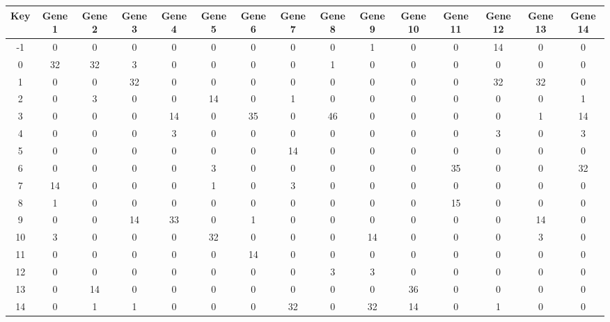 \begin{tabular}{|c|c|c|c|c|c|c|c|c|c|c|c|c|c|c|}
\hline
Key & Gene 1 & Gene 2 & Gene 3 & Gene 4 & Gene 5 & Gene 6 & Gene 7 & Gene 8 & Gene 9 & Gene 10 & Gene 11 & Gene 12 & Gene 13 & Gene 14 \\
\hline
-1 & 0 & 0 & 0 & 0 & 0 & 0 & 0 & 0 & 1 & 0 & 0 & 14 & 0 & 0 \\
0 & 32 & 32 & 3 & 0 & 0 & 0 & 0 & 1 & 0 & 0 & 0 & 0 & 0 & 0 \\
1 & 0 & 0 & 32 & 0 & 0 & 0 & 0 & 0 & 0 & 0 & 0 & 32 & 32 & 0 \\
2 & 0 & 3 & 0 & 0 & 14 & 0 & 1 & 0 & 0 & 0 & 0 & 0 & 0 & 1 \\
3 & 0 & 0 & 0 & 14 & 0 & 35 & 0 & 46 & 0 & 0 & 0 & 0 & 1 & 14 \\
4 & 0 & 0 & 0 & 3 & 0 & 0 & 0 & 0 & 0 & 0 & 0 & 3 & 0 & 3 \\
5 & 0 & 0 & 0 & 0 & 0 & 0 & 14 & 0 & 0 & 0 & 0 & 0 & 0 & 0 \\
6 & 0 & 0 & 0 & 0 & 3 & 0 & 0 & 0 & 0 & 0 & 35 & 0 & 0 & 32 \\
7 & 14 & 0 & 0 & 0 & 1 & 0 & 3 & 0 & 0 & 0 & 0 & 0 & 0 & 0 \\
8 & 1 & 0 & 0 & 0 & 0 & 0 & 0 & 0 & 0 & 0 & 15 & 0 & 0 & 0 \\
9 & 0 & 0 & 14 & 33 & 0 & 1 & 0 & 0 & 0 & 0 & 0 & 0 & 14 & 0 \\
10 & 3 & 0 & 0 & 0 & 32 & 0 & 0 & 0 & 14 & 0 & 0 & 0 & 3 & 0 \\
11 & 0 & 0 & 0 & 0 & 0 & 14 & 0 & 0 & 0 & 0 & 0 & 0 & 0 & 0 \\
12 & 0 & 0 & 0 & 0 & 0 & 0 & 0 & 3 & 3 & 0 & 0 & 0 & 0 & 0 \\
13 & 0 & 14 & 0 & 0 & 0 & 0 & 0 & 0 & 0 & 36 & 0 & 0 & 0 & 0 \\
14 & 0 & 1 & 1 & 0 & 0 & 0 & 32 & 0 & 32 & 14 & 0 & 1 & 0 & 0 \\
\hline
\end{tabular}